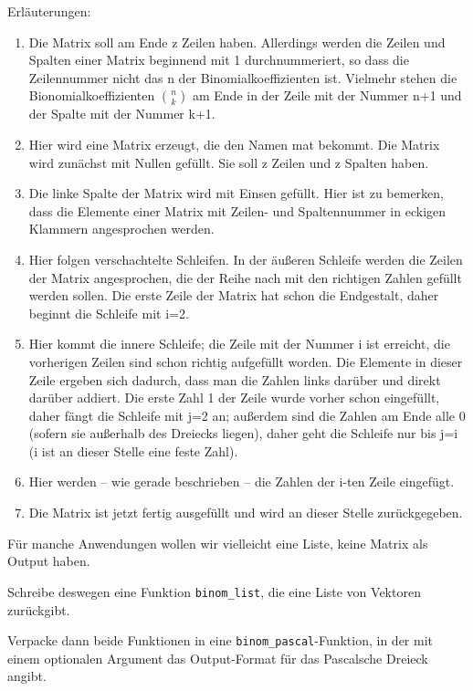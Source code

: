 \documentclass[
]{book}
\begin{document}
Erläuterungen:

\begin{enumerate}
\def\labelenumi{(\arabic{enumi})}
\item
  Die Matrix soll am Ende z Zeilen haben. Allerdings werden die Zeilen und Spalten einer Matrix beginnend mit 1 durchnummeriert, so dass die Zeilennummer nicht das n der Binomialkoeffizienten ist. Vielmehr stehen die Bionomialkoeffizienten \(n \choose k\) am Ende in der Zeile mit der Nummer n+1 und der Spalte mit der Nummer k+1.
\item
  Hier wird eine Matrix erzeugt, die den Namen mat bekommt. Die Matrix wird zunächst mit Nullen gefüllt. Sie soll z Zeilen und z Spalten haben.
\item
  Die linke Spalte der Matrix wird mit Einsen gefüllt. Hier ist zu bemerken, dass die Elemente einer Matrix mit Zeilen- und Spaltennummer in eckigen Klammern angesprochen werden.
\item
  Hier folgen verschachtelte Schleifen. In der äußeren Schleife werden die Zeilen der Matrix angesprochen, die der Reihe nach mit den richtigen Zahlen gefüllt werden sollen. Die erste Zeile der Matrix hat schon die Endgestalt, daher beginnt die Schleife mit i=2.
\item
  Hier kommt die innere Schleife; die Zeile mit der Nummer i ist erreicht, die vorherigen Zeilen sind schon richtig aufgefüllt worden. Die Elemente in dieser Zeile ergeben sich dadurch, dass man die Zahlen links darüber und direkt darüber addiert. Die erste Zahl 1 der Zeile wurde vorher schon eingefüllt, daher fängt die Schleife mit j=2 an; außerdem sind die Zahlen am Ende alle 0 (sofern sie außerhalb des Dreiecks liegen), daher geht die Schleife nur bis j=i (i ist an dieser Stelle eine feste Zahl).
\item
  Hier werden -- wie gerade beschrieben -- die Zahlen der i-ten Zeile eingefügt.
\item
  Die Matrix ist jetzt fertig ausgefüllt und wird an dieser Stelle zurückgegeben.
\end{enumerate}

Für manche Anwendungen wollen wir vielleicht eine Liste, keine Matrix als Output haben.

Schreibe deswegen eine Funktion \texttt{binom\_list}, die eine Liste von Vektoren zurückgibt.

Verpacke dann beide Funktionen in eine \texttt{binom\_pascal}-Funktion, in der mit einem optionalen Argument das Output-Format für das Pascalsche Dreieck angibt.
\end{document}
